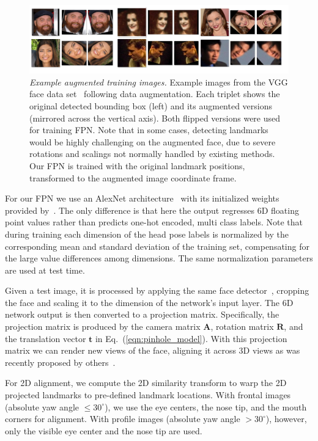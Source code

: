 \documentclass[10pt,twocolumn,letterpaper]{article}
\newcommand{\minisection}[1]{\vspace{1mm}\noindent{\bf #1}}
\begin{document}
\begin{figure}[t]
\centering
\includegraphics[width=\linewidth]{figures/augmentation_examples_a.jpg}
\caption{
{\em Example augmented training images.} Example images from the VGG face data set~\cite{Parkhi15} following data augmentation. Each triplet shows the original detected bounding box (left) and its augmented versions (mirrored across the vertical axis). Both flipped versions were used for training FPN. Note that in some cases, detecting landmarks would be highly challenging on the augmented face, due to severe rotations and scalings not normally handled by existing methods. Our FPN is trained with the original landmark positions, transformed to the augmented image coordinate frame.\vspace{-3mm}}\label{fig:augmented}
\end{figure}


\minisection{FPN training.}
For our FPN we use an AlexNet architecture~\cite{AlexNet} with its initialized weights provided by~\cite{masi2016pose}. The only difference is that here the output regresses 6D floating point values rather than predicts one-hot encoded, multi class labels. Note that during training each dimension of the head pose labels is normalized by the corresponding mean and standard deviation of the training set, compensating for the large value differences among dimensions. The same normalization parameters are used at test time. 

\minisection{2D and 3D face alignment with FPN.}
Given a test image, it is processed by applying the same face detector~\cite{yang2016multi}, cropping the face and scaling it to the dimension of the network's input layer. The 6D network output is then converted to a projection matrix. Specifically, the projection matrix is produced by the camera matrix $\mathbf{A}$, rotation matrix $\mathbf{R}$, and the translation vector $\mathbf{t}$ in Eq.~(\ref{eqn:pinhole_model}). With this projection matrix we can render new views of the face, aligning it across 3D views as was recently proposed by others~\cite{masi16dowe,masi2017rapid}.

For 2D alignment, we compute the 2D similarity transform to warp the 2D projected landmarks to pre-defined landmark locations. With frontal images (absolute yaw angle $ \le 30^\circ$), we use the eye centers, the nose tip, and the mouth corners for alignment. With profile images (absolute yaw angle $ > 30^\circ$), however, only the visible eye center and the nose tip are used.
\end{document}
